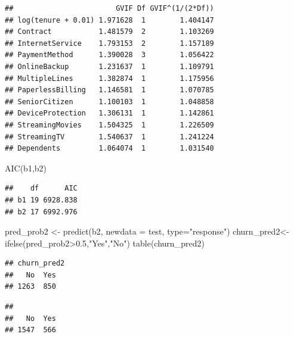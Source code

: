 \documentclass[
  twoside]{article}
\newenvironment{Shaded}{\begin{snugshade}}{\end{snugshade}}
\newcommand{\AttributeTok}[1]{\textcolor[rgb]{0.77,0.63,0.00}{#1}}
\newcommand{\FloatTok}[1]{\textcolor[rgb]{0.00,0.00,0.81}{#1}}
\newcommand{\FunctionTok}[1]{\textcolor[rgb]{0.00,0.00,0.00}{#1}}
\newcommand{\NormalTok}[1]{#1}
\newcommand{\OtherTok}[1]{\textcolor[rgb]{0.56,0.35,0.01}{#1}}
\newcommand{\SpecialCharTok}[1]{\textcolor[rgb]{0.00,0.00,0.00}{#1}}
\newcommand{\StringTok}[1]{\textcolor[rgb]{0.31,0.60,0.02}{#1}}
\begin{document}
\begin{verbatim}
##                        GVIF Df GVIF^(1/(2*Df))
## log(tenure + 0.01) 1.971628  1        1.404147
## Contract           1.481579  2        1.103269
## InternetService    1.793153  2        1.157189
## PaymentMethod      1.390028  3        1.056422
## OnlineBackup       1.231637  1        1.109791
## MultipleLines      1.382874  1        1.175956
## PaperlessBilling   1.146581  1        1.070785
## SeniorCitizen      1.100103  1        1.048858
## DeviceProtection   1.306131  1        1.142861
## StreamingMovies    1.504325  1        1.226509
## StreamingTV        1.540637  1        1.241224
## Dependents         1.064074  1        1.031540
\end{verbatim}

\begin{Shaded}
\begin{Highlighting}[]
\FunctionTok{AIC}\NormalTok{(b1,b2)}
\end{Highlighting}
\end{Shaded}

\begin{verbatim}
##    df      AIC
## b1 19 6928.838
## b2 17 6992.976
\end{verbatim}

\begin{Shaded}
\begin{Highlighting}[]
\NormalTok{pred\_prob2 }\OtherTok{\textless{}{-}} \FunctionTok{predict}\NormalTok{(b2, }\AttributeTok{newdata =}\NormalTok{ test, }\AttributeTok{type=}\StringTok{"response"}\NormalTok{)}
\NormalTok{churn\_pred2}\OtherTok{\textless{}{-}} \FunctionTok{ifelse}\NormalTok{(pred\_prob2}\SpecialCharTok{\textgreater{}}\FloatTok{0.5}\NormalTok{,}\StringTok{"Yes"}\NormalTok{,}\StringTok{"No"}\NormalTok{)}
\FunctionTok{table}\NormalTok{(churn\_pred2)}
\end{Highlighting}
\end{Shaded}

\begin{verbatim}
## churn_pred2
##   No  Yes 
## 1263  850
\end{verbatim}

\begin{Shaded}
\end{Shaded}

\begin{verbatim}
## 
##   No  Yes 
## 1547  566
\end{verbatim}
\end{document}
